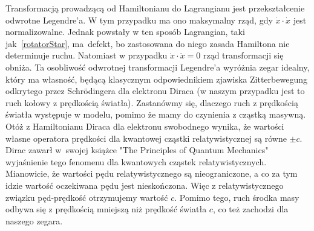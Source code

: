 Transformacją
prowadzącą od Hamiltonianu do Lagrangianu jest 
przekształcenie odwrotne Legendre'a. 
W tym przypadku ma ono maksymalny rząd, gdy $\dot{x} \cdot \dot{x}$ 
jest normalizowalne. Jednak powstały w ten sposób Lagrangian, taki 
jak~\eqref{rotatorStar},
ma~defekt, bo zastosowana do niego zasada Hamiltona nie determinuje ruchu. 
Natomiast w przypadku $\dot{x} \cdot \dot{x} = 0$  rząd transformacji
 się obniża. 
Ta osobliwość odwrotnej transformacji Legendre'a 
wyróżnia zegar idealny, który ma własność, będącą klasycznym 
odpowiednikiem zjawiska Zitterbewegung
odkrytego przez Schrödingera dla elektronu Diraca
(w naszym przypadku jest to ruch kołowy z prędkością światła). 
Zastanówmy się, dlaczego ruch z prędkością światła występuje w modelu,
pomimo że mamy do czynienia z cząstką masywną.
Otóż z Hamiltonianu Diraca dla elektronu swobodnego wynika, że 
wartości własne operatora prędkości dla kwantowej cząstki
relatywistycznej są równe $\pm c$. 
Dirac zawarł w~swojej książce "The Principles of
Quantum Mechanics"~\cite{principia} 
wyjaśnienie tego fenomenu dla kwantowych
cząstek relatywistycznych. Mianowicie, że wartości pędu relatywistycznego
są nieograniczone, a co za tym idzie 
wartość oczekiwana pędu jest nieskończona. Więc 
z relatywistycznego związku pęd-prędkość otrzymujemy wartość $c$.
Pomimo tego, ruch środka masy odbywa się z prędkością mniejszą niż 
prędkość światła $c$, co też zachodzi 
dla naszego zegara.

